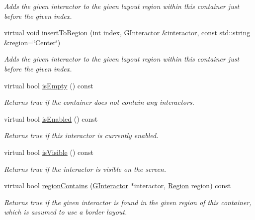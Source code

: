 \begin{DoxyCompactItemize}
\begin{DoxyCompactList}\small\item\em Adds the given interactor to the given layout region within this container just before the given index. \end{DoxyCompactList}\item 
virtual void \mbox{\hyperlink{classsgl_1_1GContainer_ad4d413f64a3e4fb948956e7249c10110}{insert\+To\+Region}} (int index, \mbox{\hyperlink{classsgl_1_1GInteractor}{G\+Interactor}} \&interactor, const std\+::string \&region=\char`\"{}Center\char`\"{})
\begin{DoxyCompactList}\small\item\em Adds the given interactor to the given layout region within this container just before the given index. \end{DoxyCompactList}\item 
virtual bool \mbox{\hyperlink{classsgl_1_1GContainer_acf82f9b2937375c7b1cf3dccb3df3312}{is\+Empty}} () const
\begin{DoxyCompactList}\small\item\em Returns true if the container does not contain any interactors. \end{DoxyCompactList}\item 
virtual bool \mbox{\hyperlink{classsgl_1_1GInteractor_aacb819fb241851fd9fc045271baa4034}{is\+Enabled}} () const
\begin{DoxyCompactList}\small\item\em Returns true if this interactor is currently enabled. \end{DoxyCompactList}\item 
virtual bool \mbox{\hyperlink{classsgl_1_1GInteractor_a9d8a6cfb13917785c143e74d40e4e2be}{is\+Visible}} () const
\begin{DoxyCompactList}\small\item\em Returns true if the interactor is visible on the screen. \end{DoxyCompactList}\item 
virtual bool \mbox{\hyperlink{classsgl_1_1GContainer_a8909db9abf4dc80058f9e4a7b90ea2d0}{region\+Contains}} (\mbox{\hyperlink{classsgl_1_1GInteractor}{G\+Interactor}} $\ast$interactor, \mbox{\hyperlink{classsgl_1_1GContainer_a81a01a86de31071a92e6cce0bab9bc4b}{Region}} region) const
\begin{DoxyCompactList}\small\item\em Returns true if the given interactor is found in the given region of this container, which is assumed to use a border layout. \end{DoxyCompactList}\item 

\end{DoxyCompactItemize}
